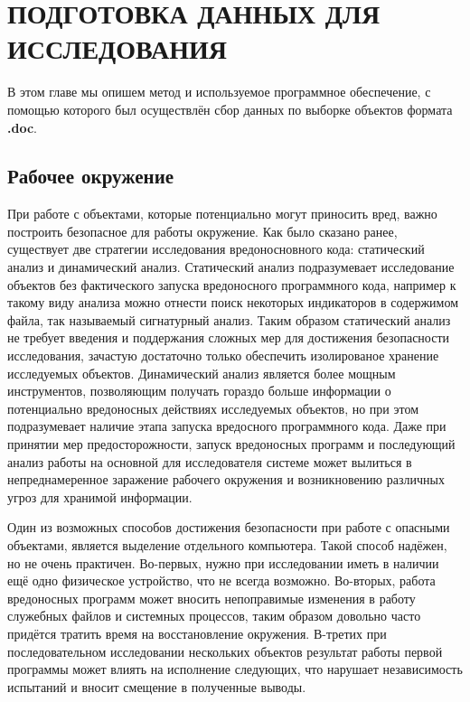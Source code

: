 \chapter{ПОДГОТОВКА ДАННЫХ ДЛЯ ИССЛЕДОВАНИЯ}

В этом главе мы опишем метод и используемое программное обеспечение, с помощью которого был осуществлён сбор данных по выборке объектов формата \textbf{.doc}.

\section{Рабочее окружение}

При работе с объектами, которые потенциально могут приносить вред, важно построить безопасное для работы окружение.
Как было сказано ранее, существует две стратегии исследования вредоносновного кода: статический анализ и динамический анализ.
Статический анализ подразумевает исследование объектов без фактического запуска вредоносного программного кода, например к такому виду анализа можно отнести поиск некоторых индикаторов в содержимом файла, так называемый сигнатурный анализ.
Таким образом статический анализ не требует введения и поддержания сложных мер для достижения безопасности исследования, зачастую достаточно только обеспечить изолированое хранение исследуемых объектов.
Динамический анализ является более мощным инструментов, позволяющим получать гораздо больше информации о потенциально вредоносных действиях исследуемых объектов, но при этом подразумевает наличие этапа запуска вредосного программного кода.
Даже при принятии мер предосторожности, запуск вредоносных программ и последующий анализ работы на основной для исследователя системе может вылиться в непреднамеренное заражение рабочего окружения и возникновению различных угроз для хранимой информации.

Один из возможных способов достижения безопасности при работе с опасными объектами, является выделение отдельного компьютера.
Такой способ надёжен, но не очень практичен. Во-первых, нужно при исследовании иметь в наличии ещё одно физическое устройство, что не всегда возможно.
Во-вторых, работа вредоносных программ может вносить непоправимые изменения в работу служебных файлов и системных процессов, таким образом довольно часто придётся тратить время на восстановление окружения.
В-третих при последовательном исследовании нескольких объектов результат работы первой программы может влиять на исполнение следующих, что нарушает независимость испытаний и вносит смещение в полученные выводы.


